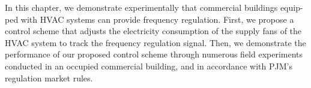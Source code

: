 \documentclass[../../thesis.tex]{subfiles}
\begin{document}
In this chapter, we demonstrate experimentally that commercial buildings equip-ped with HVAC systems can provide frequency regulation. First, we propose a control scheme that adjusts the electricity consumption of the supply fans of the HVAC system to track the frequency regulation signal.%
Then, we demonstrate the performance of our proposed control scheme through numerous field experiments conducted in an occupied commercial building, and in accordance with PJM's regulation market rules.







\end{document}

